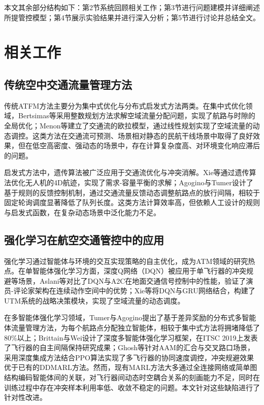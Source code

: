 \documentclass[12pt,a4paper,UTF8]{ctexart}
\begin{document}
本文其余部分结构如下：第2节系统回顾相关工作；第3节进行问题建模并详细阐述所提管控模型；第4节展示实验结果并进行深入分析；第5节进行讨论并总结全文。

\section{相关工作}
\subsection{传统空中交通流量管理方法}
传统ATFM方法主要分为集中式优化与分布式启发式方法两类。在集中式优化领域，Bertsimas等采用整数规划方法求解空域流量分配问题，实现了航路与时隙的全局优化；Menon等建立了交通流的欧拉模型，通过线性规划实现了空域流量的动态调控\cite{ref17}。这类方法在交通流可预测、场景相对静态的民航干线场景中取得了良好效果，但在低空高密度、强动态的场景中，存在计算复杂度高、对环境变化响应滞后的问题。

启发式方法中，遗传算法被广泛应用于交通流优化与冲突消解。Xie等通过遗传算法优化无人机的4D航迹，实现了需求-容量平衡的求解\cite{ref17}；Agogino与Tumer设计了基于规则的反馈控制机制，通过交通流量反馈动态调整航路点的放行间隔，相较于固定轮询调度显著降低了队列长度\cite{ref14}。这类方法计算效率高，但依赖人工设计的规则与启发式函数，在复杂动态场景中泛化能力不足。

\subsection{强化学习在航空交通管控中的应用}
强化学习通过智能体与环境的交互实现策略的自主优化，成为ATM领域的研究热点。在单智能体强化学习方面，深度Q网络（DQN）被应用于单飞行器的冲突规避等场景，Aslani等对比了DQN与A2C在地面交通信号控制中的性能，验证了演员-评论家架构在连续动作空间中的优势\cite{ref15}；Xie等将DQN与GRU网络结合，构建了UTM系统的战略决策模块，实现了空域流量的动态调度\cite{ref17}。

在多智能体强化学习领域，Tumer与Agogino提出了基于差异奖励的分布式多智能体流量管理方法，为每个航路点分配独立智能体，相较于集中式方法将拥堵降低了80\%以上\cite{ref19}；Brittain与Wei设计了深度多智能体强化学习框架，在ITSC 2019上发表了飞行器的自主间隔保持研究成果\cite{ref12}；Ghosh等针对AAM的汇合与交叉路口场景，采用深度集成方法结合PPO算法实现了多飞行器的协同速度调控\cite{ref13}，冲突规避效果优于已有的DDMARL方法。然而，现有MARL方法大多通过全连接网络或简单图结构编码智能体间的关联，对飞行器间动态时空耦合关系的刻画能力不足，同时在训练过程中存在冲突样本利用率低、收敛不稳定的问题。本文针对这些缺陷进行了针对性改进。
\end{document}
